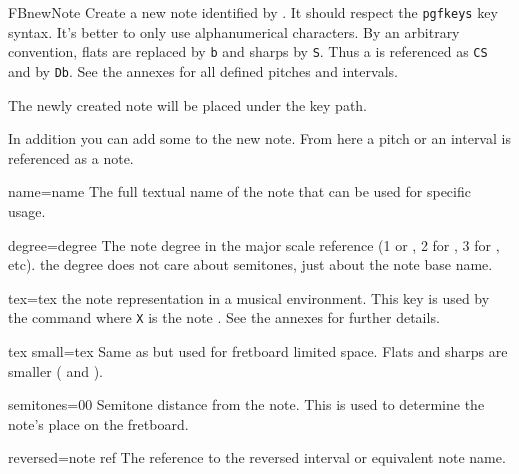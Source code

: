 \documentclass[a4paper]{article}
\newcommand{\pkg}[1]{\texttt{#1}}
\begin{document}
\begin{docCommand}{FBnewNote}{}
  Create a new note identified by . It should respect the
  \pkg{pgfkeys} key syntax. It's better to only use alphanumerical
  characters. By an arbitrary convention, flats are replaced by \texttt{b}
  and sharps by \texttt{S}. Thus a \pCS is referenced as \texttt{CS} and
  \pDb by \texttt{Db}. See the annexes for all defined pitches and
  intervals.

  The newly created note will be placed under the
   key path.
  
  In addition you can add some  to the new note. From here a
  pitch or an interval is referenced as a note.

  \begin{docKey}{name}{=name}{}
    The full textual name of the note that can be used for specific usage.
  \end{docKey}

  \begin{docKey}{degree}{=degree}{}
    The note degree in the \pC major scale reference (1 or \pC, 2 for \pD, 3
    for \pE, etc). the degree does not care about semitones, just about the
    note base name.
  \end{docKey}

  \begin{docKey}{tex}{=tex}{}
    the note representation in a musical environment. This key is used by
    the  command where \texttt{X} is the note . See the
    annexes for further details.
  \end{docKey}

  \begin{docKey}{tex small}{=tex}{}
    Same as  but used for fretboard limited
    space. Flats and sharps are smaller ( and
    ).
  \end{docKey}

  \begin{docKey}{semitones}{=0}{0}
    Semitone distance from the \pC note. This is used to determine the
    note's place on the fretboard.
  \end{docKey}

  \begin{docKey}{reversed}{=note ref}{}
    The reference to the reversed interval  or equivalent note name.
  \end{docKey}


\end{docCommand}
\end{document}
